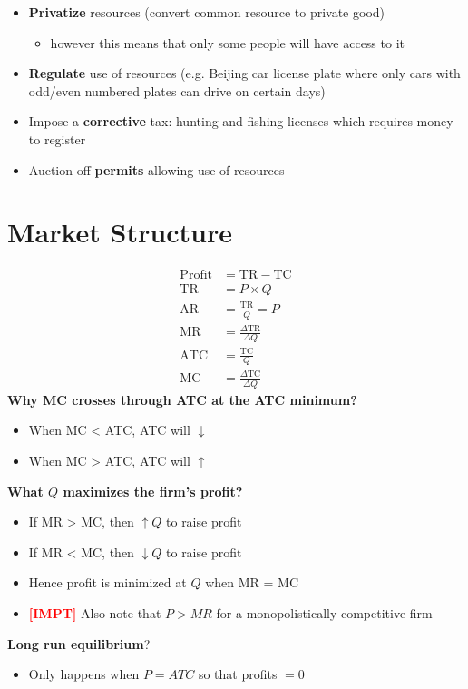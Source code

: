 \documentclass{article}
\newcommand{\impt}[0]{\textcolor{red}{\textbf{[IMPT] }}}
\begin{document}
\begin{multicols}{2}
\begin{itemize}
\begin{itemize}
    	\item \textbf{Privatize} resources (convert common resource to private good)
    	\begin{itemize}
    		\item however this means that only some people will have access to it
    	\end{itemize}
        \item \textbf{Regulate} use of resources (e.g. Beijing car license plate where only cars with odd/even numbered plates can drive on certain days)
        \item Impose a \textbf{corrective} tax: hunting and fishing licenses which requires money to register
        \item Auction off \textbf{permits} allowing use of resources
    \end{itemize}
\end{itemize}
\section{Market Structure}
\begin{equation*}
	\begin{aligned}
		\text{Profit} &= \text{TR} - \text{TC}\\
		\text{TR} &= P \times Q \\
		\text{AR} &= \frac{\text{TR}}{Q} = P\\
		\text{MR} &= \frac{\Delta \text{TR}}{\Delta Q}\\
		\text{ATC} &= \frac{\text{TC}}{Q}\\
		\text{MC} &= \frac{\Delta \text{TC}}{\Delta Q}
	\end{aligned}
\end{equation*}
\textbf{Why MC crosses through ATC at the ATC minimum?}
\begin{itemize}
	\item When MC < ATC, ATC will $\downarrow$
	\item When MC > ATC, ATC will $\uparrow$
\end{itemize}
\textbf{What $Q$ maximizes the firm's profit?}
\begin{itemize}
	\item If MR > MC, then $\uparrow Q$ to raise profit
	\item If MR < MC, then $\downarrow Q$ to raise profit
	\item Hence profit is minimized at $Q$ when MR = MC
	\item \impt Also note that $P>MR$ for a monopolistically competitive firm
\end{itemize}
\textbf{Long run equilibrium}?
\begin{itemize}
	\item Only happens when $P=ATC$ so that profits $=0$
\end{itemize}




\end{multicols}
\end{document}
